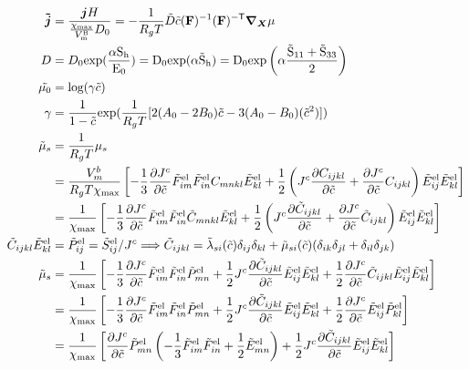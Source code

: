 \documentclass[../main.tex]{subfiles}
\begin{document}


{\color{red}{These equations need editing if Fpdot\_mat.tex is changed}}



\begin{align}
    \bm{\td{j}} &= \frac{\bm{j} H}{\cmax D_0} =-\fc{1}{R_g T} \td{D} \tc \inv{\F} \invT{\F} \nablaX \mu \\
    D &= D_0 \rm{exp}(\fc{\alpha S_h}{E_0}) = D_0 \rm{exp}(\alpha \td{S}_h)= D_0 \rm{exp}\left(\alpha \frac{\td{S}_{11}+\td{S}_{33}}{2}\right) \\ 
    \td{\mu_0} &= \text{log}(\gamma \td{c})\\
    \gamma &= \fc{1}{1-\td{c}}\text{exp}(\fc{1}{R_g T}[2(A_0 - 2B_0)\td{c} - 3(A_0 - B_0)(\td{c}^2)])\\
    \td{\mu}_s &= \frac{1}{R_g T} \mu_s \\
        &= \fc{V_m^b}{R_g T \xmax}\left[-\fc{1}{3}\pdiff{\jc}{\tc}\tFel{im}\tFel{in}{C}_{mnkl}\tEel{kl} + \fc{1}{2}\left(\jc \pdiff{C_{ijkl}}{\tc} + \pdiff{\jc}{\tc} C_{ijkl}\right)\tEel{ij}\tEel{kl}\right] \\ 
        &= \fc{1}{\xmax}\left[-\fc{1}{3}\pdiff{\jc}{\tc}\tFel{im}\tFel{in}{\td{C}}_{mnkl}\tEel{kl} + \fc{1}{2}\left(\jc \pdiff{\td{C}_{ijkl}}{\tc} + \pdiff{\jc}{\tc} \td{C}_{ijkl}\right)\tEel{ij}\tEel{kl}\right] \\
    \td{C}_{ijkl} \tEel{kl} &= \tPel{ij}  = \tSel{ij}/\jc \Longrightarrow \td{C}_{ijkl} = \td{\lambda}_{si}(\tc)\delta_{ij} \delta_{kl} +  \td{\mu}_{si}(\tc)(\delta_{ik} \delta_{jl} + \delta_{il} \delta_{jk})  \\
    \td{\mu}_s &= \fc{1}{\xmax}\left[-\fc{1}{3}\pdiff{\jc}{\tc}\tFel{im}\tFel{in}\tPel{mn} + \fc{1}{2}\jc \pdiff{\td{C}_{ijkl}}{\tc}\tEel{ij}\tEel{kl} + \fc{1}{2} \pdiff{\jc}{\tc} \td{C}_{ijkl}\tEel{ij}\tEel{kl}\right] \\
    &= \fc{1}{\xmax}\left[-\fc{1}{3}\pdiff{\jc}{\tc}\tFel{im}\tFel{in}\tPel{mn} + \fc{1}{2}\jc \pdiff{\td{C}_{ijkl}}{\tc}\tEel{ij}\tEel{kl} + \fc{1}{2} \pdiff{\jc}{\tc} \tEel{ij}\tPel{kl}\right] \\
    &= \fc{1}{\xmax}\left[\pdiff{\jc}{\tc} \tPel{mn} \left( -\fc{1}{3}\tFel{im}\tFel{in}+ \fc{1}{2} \tEel{mn}\right)+ \fc{1}{2}\jc \pdiff{\td{C}_{ijkl}}{\tc}\tEel{ij}\tEel{kl} \right] \\

\end{align}
\end{document}
